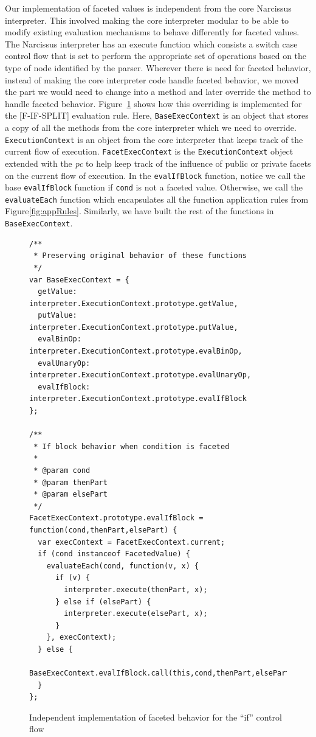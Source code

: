 Our implementation of faceted values is independent from the core Narcissus interpreter.
This involved making the core interpreter modular to be able to modify existing
evaluation mechanisms to behave differently for faceted values. The Narcissus interpreter
has an execute function which consists a switch case control flow that is set to
perform the appropriate set of operations based on the type of node identified by
the parser. Wherever there is need for faceted behavior, instead of making the core
interpreter code handle faceted behavior, we moved the part we would need to change
into a method and later override the method to handle faceted behavior.
Figure~\ref{fig:facetif} shows how this overriding is implemented for the [F-IF-SPLIT]
evaluation rule. Here, \texttt{BaseExecContext} is an object that stores a copy of all the
methods from the core interpreter which we need to override. \texttt{ExecutionContext}
is an object from the core interpreter that keeps track of the current flow of execution.
\texttt{FacetExecContext} is the \texttt{ExecutionContext} object extended with
the \textit{pc} to help keep track of the influence of public or private facets
on the current flow of execution. In the \texttt{evalIfBlock} function, notice we
call the base \texttt{evalIfBlock} function if \texttt{cond} is not a faceted value.
Otherwise, we call the \texttt{evaluateEach} function which encapsulates all the
function application rules from Figure\ref{fig:appRules}. Similarly, we have built
the rest of the functions in \texttt{BaseExecContext}.
\lstset{
  language=javascript,
  frame=single,
  breaklines=true,
  basicstyle=\footnotesize\ttfamily,
  numbers=left,
  extendedchars=true,
  tabsize=2
}
\begin{figure}
  \begin{lstlisting}
/**
 * Preserving original behavior of these functions
 */
var BaseExecContext = {
  getValue: interpreter.ExecutionContext.prototype.getValue,
  putValue: interpreter.ExecutionContext.prototype.putValue,
  evalBinOp: interpreter.ExecutionContext.prototype.evalBinOp,
  evalUnaryOp: interpreter.ExecutionContext.prototype.evalUnaryOp,
  evalIfBlock: interpreter.ExecutionContext.prototype.evalIfBlock
};

/**
 * If block behavior when condition is faceted
 *
 * @param cond
 * @param thenPart
 * @param elsePart
 */
FacetExecContext.prototype.evalIfBlock = function(cond,thenPart,elsePart) {
  var execContext = FacetExecContext.current;
  if (cond instanceof FacetedValue) {
    evaluateEach(cond, function(v, x) {
      if (v) {
        interpreter.execute(thenPart, x);
      } else if (elsePart) {
        interpreter.execute(elsePart, x);
      }
    }, execContext);
  } else {
    BaseExecContext.evalIfBlock.call(this,cond,thenPart,elsePart);
  }
};
  \end{lstlisting}
  \caption{Independent implementation of faceted behavior for the ``if'' control flow}
  \label{fig:facetif}
\end{figure}

